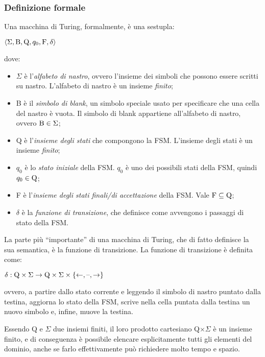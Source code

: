 \subsubsection*{Definizione formale}
Una macchina di Turing, formalmente, è una sestupla:
\begin{center}
    $\langle \Sigma, \textnormal{B}, \textnormal{Q}, q_0, \textnormal{F}, \delta \rangle$
\end{center}
dove:
\begin{itemize}
    \item $\Sigma$ è l'\textit{alfabeto di nastro}, ovvero l'insieme dei simboli che possono essere scritti su nastro. L'alfabeto di nastro è un insieme \textit{finito};
    \item B è il \textit{simbolo di blank}, un simbolo speciale usato per specificare che una cella del nastro è vuota. Il simbolo di blank appartiene all'alfabeto di nastro, ovvero $\textnormal{B} \in \Sigma$;
    \item Q è l'\textit{insieme degli stati} che compongono la FSM. L'insieme degli stati è un insieme \textit{finito};
    \item $q_0$ è lo \textit{stato iniziale} della FSM. $q_0$ è uno dei possibili stati della FSM, quindi $q_0 \in \textnormal{Q}$;
    \item F è l'\textit{insieme degli stati finali/di accettazione} della FSM. Vale $\textnormal{F} \subseteq \textnormal{Q}$;
    \item $\delta$ è la \textit{funzione di transizione}, che definisce come avvengono i passaggi di stato della FSM.
\end{itemize}

La parte più “importante” di una macchina di Turing, che di fatto definisce la sua semantica, è la funzione di transizione.
La funzione di transizione è definita come:
\begin{center}
    $\delta: \textnormal{Q} \times \Sigma \rightarrow \textnormal{Q} \times \Sigma \times \left\{ \leftarrow, \textnormal{\textendash}, \rightarrow \right\}$
\end{center}
ovvero, a partire dallo stato corrente e leggendo il simbolo di nastro puntato dalla testina, aggiorna lo stato della FSM, scrive nella cella puntata dalla testina un nuovo simbolo e, infine, muove la testina.

Essendo Q e $\Sigma$ due insiemi finiti, il loro prodotto cartesiano Q$\times \Sigma$ è un insieme finito, e di conseguenza è possibile elencare esplicitamente tutti gli elementi del dominio, anche se farlo effettivamente può richiedere molto tempo e spazio.

